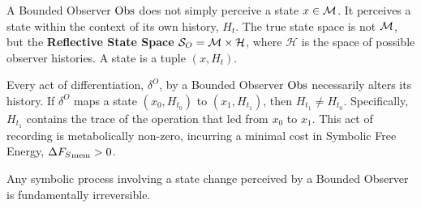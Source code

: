 \begin{definition}
\label{definition:appC_reflective_state_space}
A Bounded Observer \(\mathrm{Obs}\) does not simply perceive a state \(x \in \mathcal{M}\). It perceives a state within the context of its own history, \(H_t\). The true state space is not \(\mathcal{M}\), but the \textbf{Reflective State Space} \(\mathcal{S}_O = \mathcal{M} \times \mathcal{H}\), where \(\mathcal{H}\) is the space of possible observer histories. A state is a tuple \((x, H_t)\).
\end{definition}

\begin{axiom}
\label{axiom:appC_axiom_of_memory}
Every act of differentiation, \(\delta^O\), by a Bounded Observer \(\mathrm{Obs}\) necessarily alters its history. If \(\delta^O\) maps a state \((x_0, H_{t_0})\) to \((x_1, H_{t_1})\), then \(H_{t_1} \neq H_{t_0}\). Specifically, \(H_{t_1}\) contains the trace of the operation that led from \(x_0\) to \(x_1\). This act of recording is metabolically non-zero, incurring a minimal cost in Symbolic Free Energy, \(\Delta{F_S}_{\text{mem}} > 0\).
\end{axiom}

\begin{theorem}
\label{theorem:appC_fundamental_irreversibility_final}
Any symbolic process involving a state change perceived by a Bounded Observer is fundamentally irreversible.
\end{theorem}

